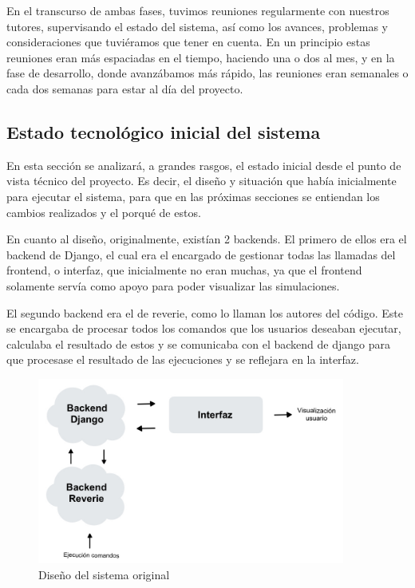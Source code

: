 En el transcurso de ambas fases, tuvimos reuniones regularmente con nuestros tutores, supervisando el estado del sistema, así como los avances, problemas y consideraciones que tuviéramos que tener en cuenta. En un principio estas reuniones eran más espaciadas en el tiempo, haciendo una o dos al mes, y en la fase de desarrollo, donde avanzábamos más rápido, las reuniones eran semanales o cada dos semanas para estar al día del proyecto.



\subsection{Estado tecnológico inicial del sistema}

En esta sección se analizará, a grandes rasgos, el estado inicial desde el punto de vista técnico del proyecto. Es decir, el diseño y situación que había inicialmente para ejecutar el sistema, para que en las próximas secciones se entiendan los cambios realizados y el porqué de estos.

En cuanto al diseño, originalmente, existían 2 backends. El primero de ellos era el backend de Django, el cual era el encargado de gestionar todas las llamadas del frontend, o interfaz, que inicialmente no eran muchas, ya que el frontend solamente servía como apoyo para poder visualizar las simulaciones. 

El segundo backend era el de reverie, como lo llaman los autores del código. Este se encargaba de procesar todos los comandos que los usuarios deseaban ejecutar, calculaba el resultado de estos y se comunicaba con el backend de django para que procesase el resultado de las ejecuciones y se reflejara en la interfaz.

\begin{figure}[h]
	\centering
	\includegraphics[width = 0.9\textwidth]{Imagenes/Vectorial/disenoSistemaOriginal.jpeg}
	\caption{Diseño del sistema original}
	\label{fig:sistemaOriginal}
\end{figure}

